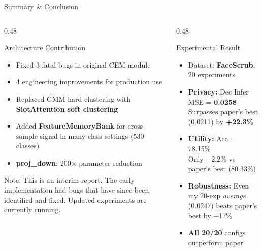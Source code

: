 \documentclass[aspectratio=169, 10pt]{beamer}
\newcommand{\good}[1]{\textcolor{goodgreen}{#1}}
\begin{document}
\begin{frame}{Summary \& Conclusion}

\begin{columns}[T]
\begin{column}{0.48\textwidth}
\begin{block}{Architecture Contribution}
\begin{itemize}\small\setlength{\itemsep}{2pt}
    \item Fixed 3 fatal bugs in original CEM module
    \item 4 engineering improvements for production use
    \item Replaced GMM hard clustering with \textbf{SlotAttention soft clustering}
    \item Added \textbf{FeatureMemoryBank} for cross-sample signal in many-class settings (530 classes)
    \item \textbf{proj\_down}: 200$\times$ parameter reduction
\end{itemize}
{\scriptsize\color{warnorg} Note: This is an interim report. The early implementation had bugs that have since been identified and fixed. Updated experiments are currently running.}
\end{block}
\end{column}
\begin{column}{0.48\textwidth}
\begin{alertblock}{Experimental Result}
\begin{itemize}\small\setlength{\itemsep}{2pt}
    \item Dataset: \textbf{FaceScrub}, 20 experiments
    \item \textbf{Privacy:} Dec Infer MSE = \textbf{0.0258}\\
    Surpasses paper's best (0.0211) by \good{\textbf{+22.3\%}}
    \item \textbf{Utility:} Acc = 78.15\%\\
    Only $-$2.2\% vs paper's best (80.33\%)
    \item \textbf{Robustness:} Even my 20-exp \textit{average} (0.0247) beats paper's best by +17\%
    \item \textbf{All 20/20} configs outperform paper
\end{itemize}
\end{alertblock}
\end{column}
\end{columns}


\end{frame}
\end{document}
